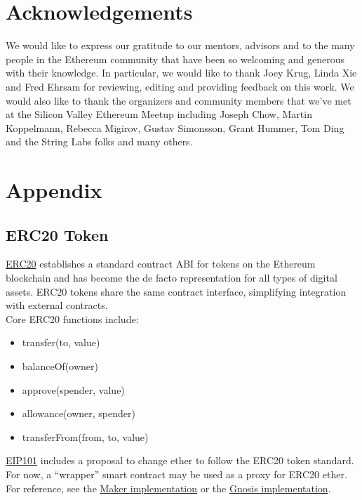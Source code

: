 \documentclass[10pt]{article}
\begin{document}
\pagebreak

\section{Acknowledgements}
We would like to express our gratitude to our mentors, advisors and to the many people in the Ethereum community that have been so welcoming and generous with their knowledge. In particular, we would like to thank Joey Krug, Linda Xie and Fred Ehrsam for reviewing, editing and providing feedback on this work. We would also like to thank the organizers and community members that we've met at the Silicon Valley Ethereum Meetup including Joseph Chow, Martin Koppelmann, Rebecca Migirov, Gustav Simonsson, Grant Hummer, Tom Ding and the String Labs folks and many others.

\pagebreak

\section{Appendix}

\subsection{ERC20 Token}

\href{https://github.com/ethereum/EIPs/issues/20}{ERC20} establishes a standard contract ABI for tokens on the Ethereum blockchain and has become the de facto representation for all types of digital assets. ERC20 tokens share the same contract interface, simplifying integration with external contracts. \\ 

\noindent Core ERC20 functions include:

\begin{itemize}[noitemsep]
\item transfer(to, value)
\item balanceOf(owner)
\item approve(spender, value)
\item allowance(owner, spender)
\item transferFrom(from, to, value)
\end{itemize}

\noindent\href{https://github.com/ethereum/EIPs/issues/28}{EIP101} includes a proposal to change ether to follow the ERC20 token standard. For now, a ``wrapper'' smart contract may be used as a proxy for ERC20 ether. For reference, see the \href{https://github.com/makerdao/token-wrapper/blob/82d379769390c336abcb8ac0629d039a44d21e22/src/wrapper.sol}{Maker implementation} or the \href{https://github.com/ConsenSys/gnosis-contracts/blob/master/contracts/solidity/Tokens/EtherToken.sol}{Gnosis implementation}.
\end{document}
